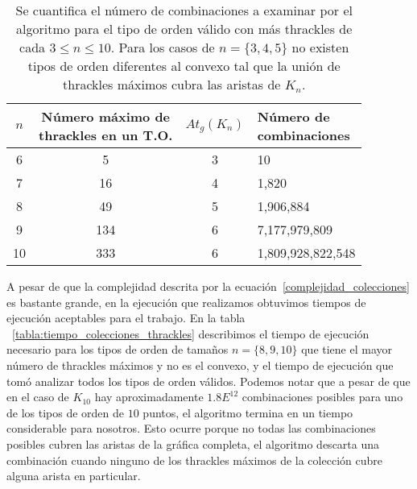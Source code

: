   \begin{table}
    \centering
    \begin{tabular}{|c|c|c|l|}
      \hline
      $n$ & \makecell{Número máximo de \\ thrackles en un T.O.} &$At_g(K_n)$& \makecell{Número de \\      combinaciones} \\
      \hline
      6 & 5 & 3 & 10 \\ \hline
      7 & 16 & 4 & 1,820 \\\hline
      8 & 49 & 5 & 1,906,884 \\\hline
      9 & 134 & 6 & 7,177,979,809 \\\hline
      10 & 333 & 6 & 1,809,928,822,548 \\ \hline
    \end{tabular}
    \caption{Se cuantifica el número de combinaciones a examinar por el algoritmo para el
    tipo de orden válido con más thrackles de cada $ 3 \leq n \leq 10$. Para los casos de
    $n = \{3,4,5\}$ no existen tipos de orden diferentes al convexo tal que la unión de
    thrackles máximos cubra las aristas de $K_n$.}
    \label{tabla:numero_operaciones_thrackles_maximos}
  \end{table}

  A pesar de que la complejidad descrita por la ecuación~\ref{complejidad_colecciones} es bastante
  grande, en la ejecución que realizamos obtuvimos tiempos de ejecución aceptables para el trabajo.
  En la tabla ~\ref{tabla:tiempo_colecciones_thrackles} describimos el tiempo de ejecución
  necesario para los tipos de orden de tamaños $n=\{8,9,10\}$ que tiene el mayor número de thrackles
  máximos y no es el convexo, y el tiempo de ejecución que tomó analizar todos los tipos de orden
  válidos. Podemos notar que a pesar de que en el caso de $K_{10}$ hay aproximadamente $1.8E^{12}$
  combinaciones posibles para uno de los tipos de orden de $10$ puntos, el algoritmo termina en un
  tiempo considerable para nosotros. Esto ocurre porque no todas las combinaciones posibles cubren las
  aristas de la gráfica completa, el algoritmo descarta una combinación cuando ninguno de los
  thrackles máximos de la colección cubre alguna arista en particular.

